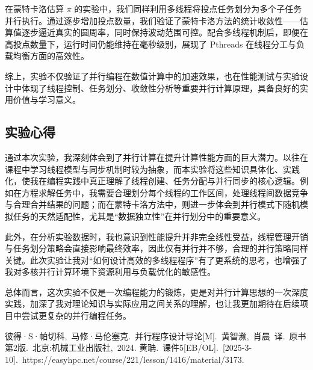 \documentclass[a4paper, utf8]{ctexart}
\begin{document}
	在蒙特卡洛估算 $\pi$ 的实验中，我们同样利用多线程将投点任务划分为多个子任务并行执行。通过逐步增加投点数量，我们验证了蒙特卡洛方法的统计收敛性——估算值逐步逼近真实的圆周率，同时保持波动范围可控。配合多线程机制后，即便在高投点数量下，运行时间仍能维持在毫秒级别，展现了 Pthreads 在线程分工与负载均衡方面的高效性。
	
	综上，实验不仅验证了并行编程在数值计算中的加速效果，也在性能测试与实验设计中体现了线程控制、任务划分、收敛性分析等重要并行计算原理，具备良好的实用价值与学习意义。
	
	\subsection{实验心得}
	
	通过本次实验，我深刻体会到了并行计算在提升计算性能方面的巨大潜力。以往在课程中学习线程模型与同步机制时较为抽象，而本实验将这些知识具体化、实践化，使我在编程实践中真正理解了线程创建、任务分配与并行同步的核心逻辑。例如在方程求解任务中，我需要合理划分每个线程的工作区间，处理线程间数据竞争与合理合并结果的问题；而在蒙特卡洛方法中，则进一步体会到并行模式下随机模拟任务的天然适配性，尤其是“数据独立性”在并行划分中的重要意义。
	
	此外，在分析实验数据时，我也意识到性能提升并非完全线性受益，线程管理开销与任务划分策略会直接影响最终效率，因此仅有并行并不够，合理的并行策略同样关键。此次实验让我对“如何设计高效的多线程程序”有了更系统的思考，也增强了我对多核并行计算环境下资源利用与负载优化的敏感性。
	
	总体而言，这次实验不仅是一次编程能力的锻炼，更是对并行计算思想的一次深度实践，加深了我对理论知识与实际应用之间关系的理解，也让我更加期待在后续项目中尝试更复杂的并行编程任务。
	
	\let\cleardoublepage\clearpage
	
	\begin{thebibliography}{99}  
		 彼得·S·帕切科,\ 马修·马伦塞克.\ 并行程序设计导论[M].\ 黄智濒,\ 肖晨\ 译.\ 原书第2版.\ 北京:机械工业出版社,\ 2024.
		 黄聃.\ 课件5[EB/OL].\ [2025-3-10].\ https://easyhpc.net/course/221/lesson/1416/material/3173.
	\end{thebibliography}
	
\end{document}
